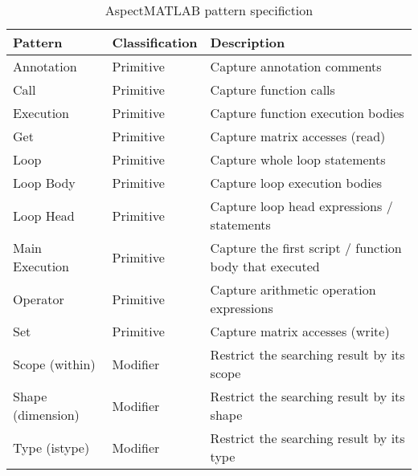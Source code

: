 \begin{table}[!htbp]
\begin{center}
\begin{tabular}{l|l|l}
\hline
Pattern            & Classification & Description                                             \\
\hline
Annotation         & Primitive      & Capture annotation comments                             \\
Call               & Primitive      & Capture function calls                                  \\
Execution          & Primitive      & Capture function execution bodies                       \\
Get                & Primitive      & Capture matrix accesses (read)                          \\
Loop               & Primitive      & Capture whole loop statements                           \\
Loop Body          & Primitive      & Capture loop execution bodies                           \\
Loop Head          & Primitive      & Capture loop head expressions / statements              \\
Main Execution     & Primitive      & Capture the first script / function body that executed  \\
Operator           & Primitive      & Capture arithmetic operation expressions                \\
Set                & Primitive      & Capture matrix accesses (write)                         \\
Scope (within)     & Modifier       & Restrict the searching result by its scope              \\
Shape (dimension)  & Modifier       & Restrict the searching result by its shape              \\
Type  (istype)     & Modifier       & Restrict the searching result by its type               \\
\hline
\end{tabular}
\end{center}
\caption{AspectMATLAB pattern specifiction}
\end{table}
